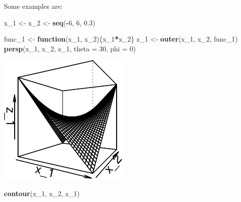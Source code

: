 \documentclass[11pt,]{article}
\newenvironment{Shaded}{\begin{snugshade}}{\end{snugshade}}
\newcommand{\KeywordTok}[1]{\textcolor[rgb]{0.13,0.29,0.53}{\textbf{#1}}}
\newcommand{\DataTypeTok}[1]{\textcolor[rgb]{0.13,0.29,0.53}{#1}}
\newcommand{\DecValTok}[1]{\textcolor[rgb]{0.00,0.00,0.81}{#1}}
\newcommand{\FloatTok}[1]{\textcolor[rgb]{0.00,0.00,0.81}{#1}}
\newcommand{\StringTok}[1]{\textcolor[rgb]{0.31,0.60,0.02}{#1}}
\newcommand{\ControlFlowTok}[1]{\textcolor[rgb]{0.13,0.29,0.53}{\textbf{#1}}}
\newcommand{\OperatorTok}[1]{\textcolor[rgb]{0.81,0.36,0.00}{\textbf{#1}}}
\newcommand{\NormalTok}[1]{#1}
\begin{document}
Some examples are:

\begin{Shaded}
\begin{Highlighting}[]
\NormalTok{x_}\DecValTok{1}\NormalTok{ <-}\StringTok{ }\NormalTok{x_}\DecValTok{2}\NormalTok{ <-}\StringTok{ }\KeywordTok{seq}\NormalTok{(}\OperatorTok{-}\DecValTok{6}\NormalTok{, }\DecValTok{6}\NormalTok{, }\FloatTok{0.3}\NormalTok{)}

\NormalTok{func_}\DecValTok{1}\NormalTok{ <-}\StringTok{ }\ControlFlowTok{function}\NormalTok{(x_}\DecValTok{1}\NormalTok{, x_}\DecValTok{2}\NormalTok{)\{x_}\DecValTok{1}\OperatorTok{*}\NormalTok{x_}\DecValTok{2}\NormalTok{\}}
\NormalTok{z_}\DecValTok{1}\NormalTok{ <-}\StringTok{ }\KeywordTok{outer}\NormalTok{(x_}\DecValTok{1}\NormalTok{, x_}\DecValTok{2}\NormalTok{, func_}\DecValTok{1}\NormalTok{)}
\KeywordTok{persp}\NormalTok{(x_}\DecValTok{1}\NormalTok{, x_}\DecValTok{2}\NormalTok{, z_}\DecValTok{1}\NormalTok{, }\DataTypeTok{theta =} \DecValTok{30}\NormalTok{, }\DataTypeTok{phi =} \DecValTok{0}\NormalTok{)}
\end{Highlighting}
\end{Shaded}

\begin{center}\includegraphics{Optimization_2_files/figure-latex/level_sets-1} \end{center}

\begin{Shaded}
\begin{Highlighting}[]
\KeywordTok{contour}\NormalTok{(x_}\DecValTok{1}\NormalTok{, x_}\DecValTok{2}\NormalTok{, z_}\DecValTok{1}\NormalTok{)}
\end{Highlighting}
\end{Shaded}
\end{document}
